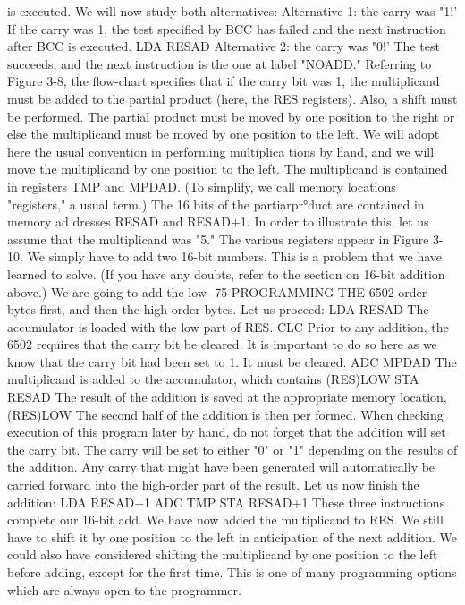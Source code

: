 is executed. We will now study both alternatives:
Alternative 1: the carry was "1!'
If the carry was 1, the test specified by BCC has failed and the next
instruction after BCC is executed.
LDA RESAD
Alternative 2: the carry was "0!'
The test succeeds, and the next instruction is the one at label
"NOADD."
Referring to Figure 3-8, the flow-chart specifies that if the carry
bit was 1, the multiplicand must be added to the partial product
(here, the RES registers). Also, a shift must be performed. The
partial product must be moved by one position to the right or else
the multiplicand must be moved by one position to the left. We
will adopt here the usual convention in performing multiplica
tions by hand, and we will move the multiplicand by one position
to the left.
The multiplicand is contained in registers TMP and MPDAD.
(To simplify, we call memory locations "registers," a usual term.)
The 16 bits of the partiarpr°duct are contained in memory ad
dresses RESAD and RESAD+1.
In order to illustrate this, let us assume that the multiplicand
was "5." The various registers appear in Figure 3-10.
We simply have to add two 16-bit numbers. This is a problem
that we have learned to solve. (If you have any doubts, refer to
the section on 16-bit addition above.) We are going to add the low-
75
PROGRAMMING THE 6502
order bytes first, and then the high-order bytes. Let us proceed:
LDA RESAD
The accumulator is loaded with the low part of RES.
CLC
Prior to any addition, the 6502 requires that the carry bit be
cleared. It is important to do so here as we know that the carry bit
had been set to 1. It must be cleared.
ADC MPDAD
The multiplicand is added to the accumulator, which contains
(RES)LOW
STA RESAD
The result of the addition is saved at the appropriate memory
location, (RES)LOW The second half of the addition is then per
formed. When checking execution of this program later by hand,
do not forget that the addition will set the carry bit. The carry will
be set to either "0" or "1" depending on the results of the addition.
Any carry that might have been generated will automatically be
carried forward into the high-order part of the result.
Let us now finish the addition:
LDA RESAD+1
ADC TMP
STA RESAD+1
These three instructions complete our 16-bit add. We have now
added the multiplicand to RES. We still have to shift it by one
position to the left in anticipation of the next addition. We could
also have considered shifting the multiplicand by one position
to the left before adding, except for the first time. This is one of many
programming options which are always open to the programmer.
